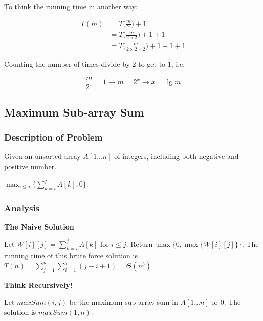 To think the running time in another way:

\begin{align*}
T(m) &= T\Big(\frac{m}{2}\Big) + 1 \\
     &= T\Big(\frac{m}{2\times 2}\Big) + 1 + 1 \\
     &= T\Big(\frac{m}{2\times 2\times 2}\Big) + 1 + 1 + 1
\end{align*}

Counting the number of times divide by 2 to get to 1, i.e.

\[\frac{m}{2^x} = 1 \rightarrow m = 2^x \rightarrow x = \lg{m}\]


\subsection{Maximum Sub-array Sum}

\subsubsection{Description of Problem}

\AlgoInput Given an unsorted array $A[1 \ldots n]$ of integers,
including both negative and positive number.

\AlgoOutput $\displaystyle\max_{i\leq j}\bigg\{\sum_{k=i}^j{A[k]}, 0\bigg\}$.

\subsubsection{Analysis}

\textbf{The Naive Solution}

Let $W[i][j] = \displaystyle\sum_{k=i}^j{A[k]}$ for $i \leq j$.
Return $\max\{0, \max\{W[i][j]\}\}$.
The running time of this brute force solution is$T(n) = \displaystyle\sum_{j=1}^n{\sum_{i=1}^j{(j-i+1)}} = \Theta(n^3)$

\noindent\textbf{Think Recursively!}

Let $maxSum(i,j)$ be the maximum sub-array sum in $A[1 \ldots n]$ or $0$.
The solution is $maxSum(1,n)$.

